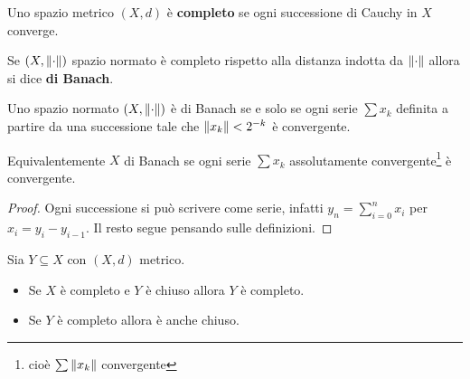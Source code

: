 \begin{definition}
Uno spazio metrico $(X,d)$ \`e \textbf{completo} se ogni successione di Cauchy in $X$ converge.

Se $(X,\left\Vert{\cdot}\right\Vert)$ spazio normato \`e completo rispetto alla distanza indotta da $\left\Vert{\cdot}\right\Vert$ allora si dice \textbf{di Banach}.
\end{definition}

\begin{remark}
Uno spazio normato $(X,\left\Vert{\cdot}\right\Vert)$ \`e di Banach se e solo se ogni serie $\sum x_k$ definita a partire da una successione tale che $\left\Vert{x_k}\right\Vert<2^{-k}$ \`e convergente.

Equivalentemente $X$ di Banach se ogni serie $\sum x_k$ assolutamente convergente\footnote{cio\`e $\sum \left\Vert{x_k}\right\Vert$ convergente} \`e convergente.
\end{remark}
\begin{proof}
Ogni successione si pu\`o scrivere come serie, infatti $y_n=\sum_{i=0}^n x_i$ per $x_i=y_i-y_{i-1}$. Il resto segue pensando sulle definizioni.
\end{proof}

\begin{remark}
Sia $Y\subseteq X$ con $(X,d)$ metrico. 
\begin{itemize}
    \item Se $X$ \`e completo e $Y$ \`e chiuso allora $Y$ \`e completo. 
    \item Se $Y$ \`e completo allora \`e anche chiuso.
\end{itemize}
\end{remark}

